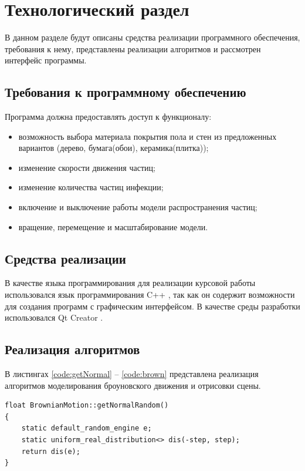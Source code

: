 \chapter{Технологический раздел}
\label{cha:impl}

В данном разделе будут описаны средства реализации программного обеспечения, требования к нему, представлены реализации алгоритмов и рассмотрен интерфейс программы.

\section{Требования к программному обеспечению}

Программа должна предоставлять доступ к функционалу:

\begin{itemize}
	\item возможность выбора материала покрытия пола и стен из предложенных вариантов (дерево, бумага(обои), керамика(плитка));
	\item изменение скорости движения частиц;
	\item изменение количества частиц инфекции;
	\item включение и выключение работы модели распространения частиц;
	\item вращение, перемещение и масштабирование модели.
\end{itemize}

\section{Средства реализации}

В качестве языка программирования для реализации курсовой работы использовался язык программирования C++ \cite{cplusplus}, так как он содержит возможности для создания программ с графическим интерфейсом. В качестве среды разработки использовался Qt Creator \cite{qtcreator}.

\section{Реализация алгоритмов}

В листингах \ref{code:getNormal} -- \ref{code:brown} представлена реализация алгоритмов моделирования броуновского движения и отрисовки сцены.

\begin{lstlisting}[label=code:getNormal,caption=Реализация вспомогательной функции вычисления распределенной нормально случайной величины]
float BrownianMotion::getNormalRandom()
{
	static default_random_engine e;
	static uniform_real_distribution<> dis(-step, step);
	return dis(e);
}
\end{lstlisting}

